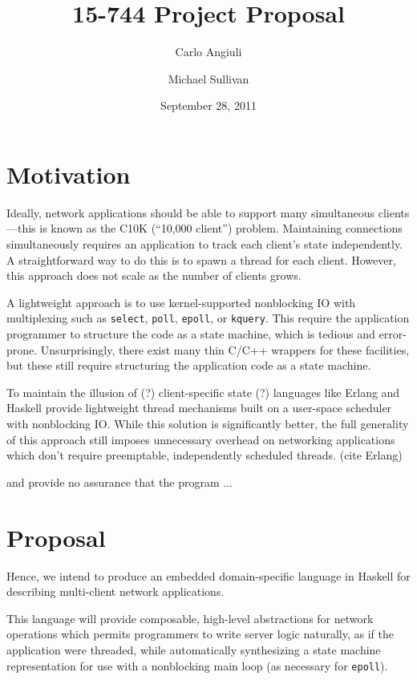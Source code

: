\documentclass{article}
\title{15-744 Project Proposal}
\author{Carlo Angiuli \and Michael Sullivan}
\date{September 28, 2011}
\renewcommand{\t}{\texttt}
\begin{document}
\maketitle


\section{Motivation}

Ideally, network applications should be able to support many simultaneous
clients---this is known as the C10K (``10,000 client'') problem\cite{c10k}.
Maintaining connections simultaneously requires an application to track each
client's state independently. A straightforward way to do this is to spawn a
thread for each client. However, this approach does not scale as the number of
clients grows. 

A lightweight approach is to use kernel-supported nonblocking IO with
multiplexing such as \t{select}, \t{poll}, \t{epoll}, or \t{kquery}. This
require the application programmer to structure the code as a state machine,
which is tedious and error-prone. Unsurprisingly, there exist many thin C/C++
wrappers for these facilities, but these still require structuring the
application code as a state machine.

To maintain the illusion of (?) client-specific state (?) languages like Erlang
and Haskell provide lightweight thread mechanisms built on a user-space
scheduler with nonblocking IO. While this solution is significantly better, the
full generality of this approach still imposes unnecessary overhead on
networking applications which don't require preemptable, independently scheduled
threads.
(cite Erlang)

and provide no assurance that the program ...

\section{Proposal}

Hence, we intend to produce an embedded domain-specific language in Haskell for
describing multi-client network applications. 

This language will provide composable, high-level abstractions for network
operations which permits programmers to write server logic naturally, as if the
application were threaded, while automatically synthesizing a state machine
representation for use with a nonblocking main loop (as necessary for
\t{epoll}).
\end{document}
